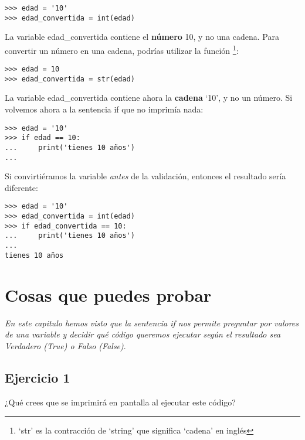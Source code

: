 \begin{listing}
\begin{verbatim}
>>> edad = '10'
>>> edad_convertida = int(edad)
\end{verbatim}
\end{listing}

\noindent
La variable edad\_convertida contiene el \textbf{número} 10, y no una cadena. Para convertir un número en una cadena, podrías utilizar la función \footnote{`str' es la contracción de `string' que significa `cadena' en inglés}:

\begin{listing}
\begin{verbatim}
>>> edad = 10
>>> edad_convertida = str(edad)
\end{verbatim}
\end{listing}

\noindent
La variable edad\_convertida contiene ahora la \textbf{cadena} `10', y no un número.  Si volvemos ahora a la sentencia if que no imprimía nada:

\begin{listing}
\begin{verbatim}
>>> edad = '10'
>>> if edad == 10:
...     print('tienes 10 años')
...
\end{verbatim}
\end{listing}

\noindent
Si convirtiéramos la variable \emph{antes} de la validación, entonces el resultado sería diferente:

\begin{listing}
\begin{verbatim}
>>> edad = '10'
>>> edad_convertida = int(edad)
>>> if edad_convertida == 10:
...     print('tienes 10 años')
...
tienes 10 años
\end{verbatim}
\end{listing}

\section{Cosas que puedes probar}

\emph{En este capitulo hemos visto que la sentencia if nos permite preguntar por valores de una variable y decidir qué código queremos ejecutar según el resultado sea Verdadero (True) o Falso (False)}.

\subsection*{Ejercicio 1}
¿Qué crees que se imprimirá en pantalla al ejecutar este código?

